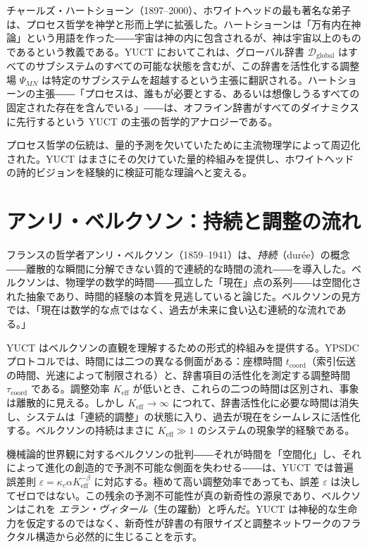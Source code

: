\documentclass[12pt,a4paper]{article}
\begin{document}
	チャールズ・ハートショーン（1897–2000）、ホワイトヘッドの最も著名な弟子は、プロセス哲学を神学と形而上学に拡張した。ハートショーンは「万有内在神論」という用語を作った――宇宙は神の内に包含されるが、神は宇宙以上のものであるという教義である。YUCT においてこれは、グローバル辞書 \(\mathcal{D}_{\text{global}}\) はすべてのサブシステムのすべての可能な状態を含むが、この辞書を活性化する調整場 \(\Psi_{MN}\) は特定のサブシステムを超越するという主張に翻訳される。ハートショーンの主張――「プロセスは、誰もが必要とする、あるいは想像しうるすべての固定された存在を含んでいる」――は、オフライン辞書がすべてのダイナミクスに先行するという YUCT の主張の哲学的アナロジーである。
	
	プロセス哲学の伝統は、量的予測を欠いていたために主流物理学によって周辺化された。YUCT はまさにその欠けていた量的枠組みを提供し、ホワイトヘッドの詩的ビジョンを経験的に検証可能な理論へと変える。
	
	\section{アンリ・ベルクソン：持続と調整の流れ}
	
	フランスの哲学者アンリ・ベルクソン（1859–1941）は、\emph{持続}（durée）の概念――離散的な瞬間に分解できない質的で連続的な時間の流れ――を導入した。ベルクソンは、物理学の数学的時間――孤立した「現在」点の系列――は空間化された抽象であり、時間的経験の本質を見逃していると論じた。ベルクソンの見方では、「現在は数学的な点ではなく、過去が未来に食い込む連続的な流れである。」
	
	YUCT はベルクソンの直観を理解するための形式的枠組みを提供する。YPSDC プロトコルでは、時間には二つの異なる側面がある：座標時間 \(t_{\text{coord}}\)（索引伝送の時間、光速によって制限される）と、辞書項目の活性化を測定する調整時間 \(\tau_{\text{coord}}\) である。調整効率 \(K_{\mathrm{eff}}\) が低いとき、これらの二つの時間は区別され、事象は離散的に見える。しかし \(K_{\mathrm{eff}} \to \infty\) につれて、辞書活性化に必要な時間は消失し、システムは「連続的調整」の状態に入り、過去が現在をシームレスに活性化する。ベルクソンの持続はまさに \(K_{\mathrm{eff}} \gg 1\) のシステムの現象学的経験である。
	
	機械論的世界観に対するベルクソンの批判――それが時間を「空間化」し、それによって進化の創造的で予測不可能な側面を失わせる――は、YUCT では普遍誤差則 \(\varepsilon = \kappa_c \alpha K_{\mathrm{eff}}^{-\beta}\) に対応する。極めて高い調整効率であっても、誤差 \(\varepsilon\) は決してゼロではない。この残余の予測不可能性が真の新奇性の源泉であり、ベルクソンはこれを \emph{エラン・ヴィタール}（生の躍動）と呼んだ。YUCT は神秘的な生命力を仮定するのではなく、新奇性が辞書の有限サイズと調整ネットワークのフラクタル構造から必然的に生じることを示す。
	
\end{document}
